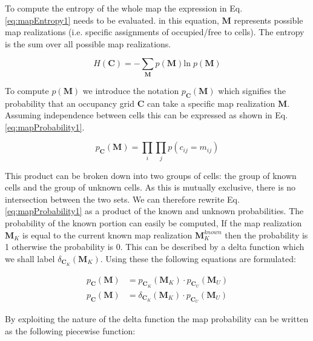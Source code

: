 \documentclass[a4paper,12pt]{article}
\begin{document}
			To compute the entropy of the whole map the expression in Eq. \ref{eq:mapEntropy1} needs to be evaluated. in this equation, $\textbf{M}$ represents possible map realizations (i.e. specific assignments of occupied/free to cells). The entropy is the sum over all possible map realizations.

			\begin{equation}
				H \left(\textbf{C}\right) = - \sum_{\textbf{M}} p\left(\textbf{M}\right) \text{ln} \; p\left(\textbf{M}\right)
				\label{eq:mapEntropy1}
			\end{equation}
			
			To compute $p(\textbf{M})$ we introduce the notation $p_\textbf{C}(\textbf{M})$ which signifies the probability that an occupancy grid $\textbf{C}$ can take a specific map realization $\textbf{M}$. Assuming independence between cells this can be expressed as shown in Eq. \ref{eq:mapProbability1}.
			
			\begin{equation}
				p_\textbf{C}(\textbf{M}) = \prod_{i} \prod_{j} p(c_{ij} = m_{ij})
				\label{eq:mapProbability1}
			\end{equation}
			
			This product can be broken down into two groups of cells: the group of known cells and the group of unknown cells. As this is mutually exclusive, there is no intersection between the two sets. We can therefore rewrite Eq. \ref{eq:mapProbability1} as a product of the known and unknown probabilities. The probability of the known portion can easily be computed, If the map realization $\textbf{M}_K$ is equal to the current known map realization $\textbf{M}_K^{known}$ then the probability is 1 otherwise the probability is 0. This can be described by a delta function which we shall label $\delta_{\textbf{C}_K}(\textbf{M}_K)$. Using these the following equations are formulated:

			\begin{equation}
				\begin{split}
					p_\textbf{C}(\textbf{M}) &= p_{\textbf{C}_K}(\textbf{M}_K) \cdot p_{\textbf{C}_U}(\textbf{M}_U) \\
					p_\textbf{C}(\textbf{M}) &= \delta_{\textbf{C}_K}(\textbf{M}_K) \cdot p_{\textbf{C}_U}(\textbf{M}_U) 
				\end{split}
				\label{eq:mapProbability2}
			\end{equation}

			By exploiting the nature of the delta function the map probability can be written as the following piecewise function:
\end{document}
